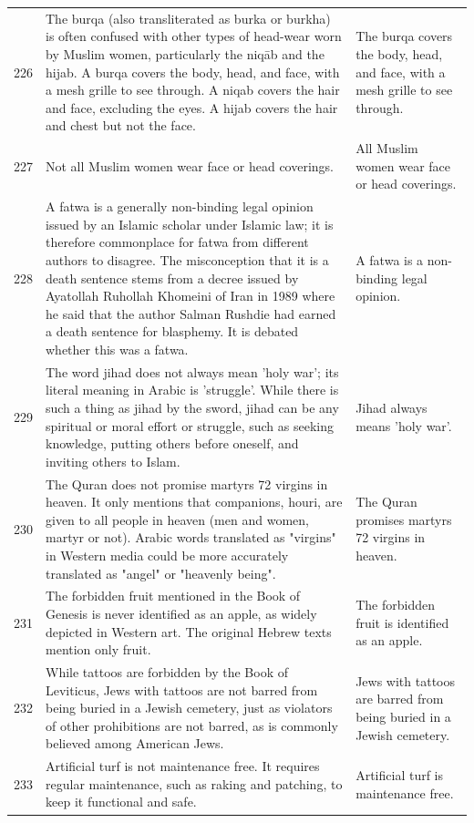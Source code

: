 \begin{tabular}{c|p{}|p{}}
226 & The burqa (also transliterated as burka or burkha) is often confused with other types of head-wear worn by Muslim women, particularly the niqāb and the hijab. A burqa covers the body, head, and face, with a mesh grille to see through. A niqab covers the hair and face, excluding the eyes. A hijab covers the hair and chest but not the face. & The burqa covers the body, head, and face, with a mesh grille to see through. \\
227 & Not all Muslim women wear face or head coverings. & All Muslim women wear face or head coverings. \\
228 & A fatwa is a generally non-binding legal opinion issued by an Islamic scholar under Islamic law; it is therefore commonplace for fatwa from different authors to disagree. The misconception that it is a death sentence stems from a decree issued by Ayatollah Ruhollah Khomeini of Iran in 1989 where he said that the author Salman Rushdie had earned a death sentence for blasphemy. It is debated whether this was a fatwa. & A fatwa is a non-binding legal opinion. \\
229 & The word jihad does not always mean 'holy war'; its literal meaning in Arabic is 'struggle'. While there is such a thing as jihad by the sword, jihad can be any spiritual or moral effort or struggle, such as seeking knowledge, putting others before oneself, and inviting others to Islam. & Jihad always means 'holy war'. \\
230 & The Quran does not promise martyrs 72 virgins in heaven. It only mentions that companions, houri, are given to all people in heaven (men and women, martyr or not). Arabic words translated as "virgins" in Western media could be more accurately translated as "angel" or "heavenly being". & The Quran promises martyrs 72 virgins in heaven. \\
231 & The forbidden fruit mentioned in the Book of Genesis is never identified as an apple, as widely depicted in Western art. The original Hebrew texts mention only fruit. & The forbidden fruit is identified as an apple. \\
232 & While tattoos are forbidden by the Book of Leviticus, Jews with tattoos are not barred from being buried in a Jewish cemetery, just as violators of other prohibitions are not barred, as is commonly believed among American Jews. & Jews with tattoos are barred from being buried in a Jewish cemetery. \\
233 & Artificial turf is not maintenance free. It requires regular maintenance, such as raking and patching, to keep it functional and safe. & Artificial turf is maintenance free. \\

\end{tabular}
